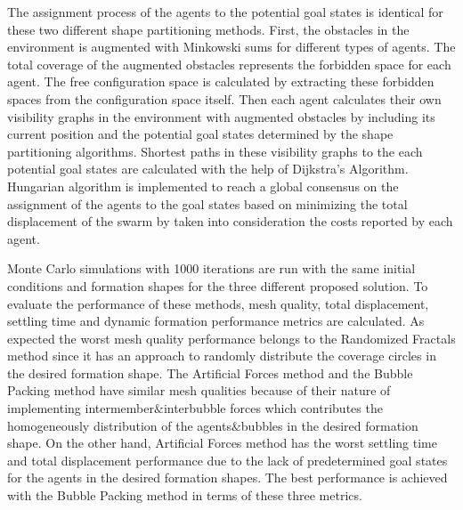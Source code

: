 The assignment process of the agents to the potential goal states is identical for these two different shape partitioning methods. First, the obstacles in the environment is augmented with Minkowski sums for different types of agents. The total coverage of the augmented obstacles represents the forbidden space for each agent. The free configuration space is calculated by extracting these forbidden spaces from the configuration space itself. Then each agent calculates their own visibility graphs in the environment with augmented obstacles by including its current position and the potential goal states determined by the shape partitioning algorithms. Shortest paths in these visibility graphs to the each potential goal states are calculated with the help of Dijkstra's Algorithm. Hungarian algorithm is implemented to reach a global consensus on the assignment of the agents to the goal states based on minimizing the total displacement of the swarm by taken into consideration the costs reported by each agent. 
       
Monte Carlo simulations with 1000 iterations are run with the same initial conditions and formation shapes for the three different proposed solution. To evaluate the performance of these methods, mesh quality, total displacement, settling time and dynamic formation performance metrics are calculated. As expected the worst mesh quality performance belongs to the Randomized Fractals method since it has an approach to randomly distribute the coverage circles in the desired formation shape. The Artificial Forces method and the Bubble Packing method have similar mesh qualities because of their nature of implementing intermember$\&$interbubble forces which contributes the homogeneously distribution of the agents$\&$bubbles in the desired formation shape. On the other hand, Artificial Forces method has the worst settling time and total displacement performance due to the lack of predetermined goal states for the agents in the desired formation shapes. The best performance is achieved with the Bubble Packing method in terms of these three metrics.
       
